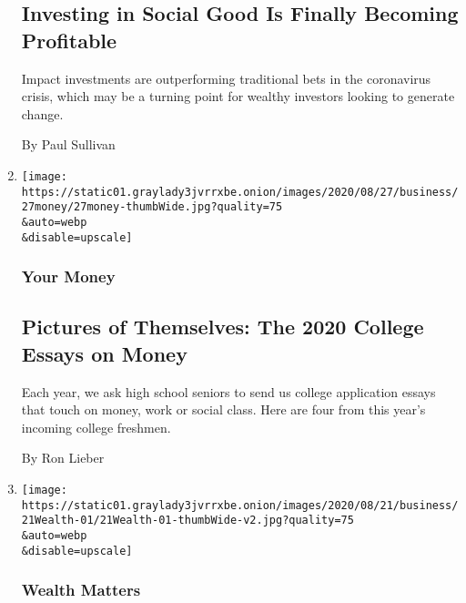 \begin{enumerate}
  \hypertarget{investing-in-social-good-is-finally-becoming-profitable}{%
  \subsection{Investing in Social Good Is Finally Becoming
  Profitable}\label{investing-in-social-good-is-finally-becoming-profitable}}

  Impact investments are outperforming traditional bets in the
  coronavirus crisis, which may be a turning point for wealthy investors
  looking to generate change.

  By Paul Sullivan
\item
  \href{/2020/08/28/your-money/pictures-of-themselves-the-2020-college-essays-on-money.html}{}

  \texttt{[image: https://static01.graylady3jvrrxbe.onion/images/2020/08/27/business/27money/27money-thumbWide.jpg?quality=75\\\&auto=webp\\\&disable=upscale]}

  \hypertarget{your-money-2}{%
  \subsubsection{Your Money}\label{your-money-2}}

  \hypertarget{pictures-of-themselves-the-2020-college-essays-on-money}{%
  \subsection{Pictures of Themselves: The 2020 College Essays on
  Money}\label{pictures-of-themselves-the-2020-college-essays-on-money}}

  Each year, we ask high school seniors to send us college application
  essays that touch on money, work or social class. Here are four from
  this year's incoming college freshmen.

  By Ron Lieber
\item
  \href{/2020/08/21/your-money/concierge-personal-medical-care-coronavirus.html}{}

  \texttt{[image: https://static01.graylady3jvrrxbe.onion/images/2020/08/21/business/21Wealth-01/21Wealth-01-thumbWide-v2.jpg?quality=75\\\&auto=webp\\\&disable=upscale]}

  \hypertarget{wealth-matters-3}{%
  \subsubsection{Wealth Matters}\label{wealth-matters-3}}


\end{enumerate}

